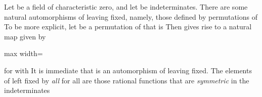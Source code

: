 \documentclass[11pt,oneside]{article}
\begin{document}
\fi
\renewcommand{\BookFooter}{Section 47 Illustrations of Galois Theory}
\ifdefined\BookMaster\else\setcounter{page}{372}\fi
\BookNarrativetrue

\begin{BookBody}



\noindent Let  be a field of characteristic zero, and let  be indeterminates. There are some natural automorphisms of  leaving  fixed, namely, those defined by permutations of  To be more explicit, let \BookInline{\sigma } be a permutation of  that is Then \BookInline{\sigma } gives rise to a natural map  given by

\begin{center}\begin{adjustbox}{max width=\linewidth}\end{adjustbox}\end{center}

\noindent for  with  It is immediate that \BookInline{\overline{\sigma }} is an automorphism of  leaving  fixed. The elements of  left fixed by\textit{ all} \BookInline{\overline{\sigma },\allowbreak } for all  are those rational functions that are \textit{symmetric} in the indeterminates 


\end{BookBody}
\end{document}
